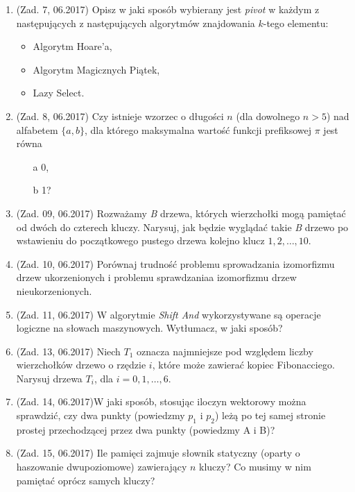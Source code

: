 \documentclass[10pt]{article}%
\begin{document}
\begin{enumerate}
\item (Zad. 7, 06.2017) Opisz w jaki sposób wybierany jest \emph{pivot} w każdym z następujących z następujących algorytmów znajdowania $k$-tego elementu: 
\begin{itemize}
\item Algorytm Hoare'a,
\item Algorytm Magicznych Piątek,
\item Lazy Select.
\end{itemize}

\item (Zad. 8, 06.2017) Czy istnieje wzorzec o długości $n$ (dla dowolnego $n>5$) nad alfabetem $\{a,b\}$, dla którego maksymalna wartość funkcji prefiksowej $\pi$ jest równa 
\begin{itemize}
\item[a] 0,
\item[b] 1?
\end{itemize}
 
\item (Zad. 09, 06.2017) Rozważamy \emph{B} drzewa, których wierzchołki mogą pamiętać od dwóch do czterech kluczy. Narysuj, jak będzie wyglądać takie \emph{B} drzewo po wstawieniu do początkowego pustego drzewa kolejno klucz $1,2,\ldots,10$.

\item (Zad. 10, 06.2017) Porównaj trudność problemu sprowadzania izomorfizmu drzew ukorzenionych i problemu sprawdzaniaa izomorfizmu drzew nieukorzenionych.

\item (Zad. 11, 06.2017) W algorytmie \emph{Shift And} wykorzystywane są operacje logiczne na słowach maszynowych. Wytłumacz, w jaki sposób?

\item (Zad. 13, 06.2017) Niech $T_{1}$ oznacza najmniejsze pod względem liczby wierzchołków drzewo o rzędzie $i$, które może zawierać kopiec Fibonacciego. Narysuj drzewa $T_{i}$, dla $i = 0,1,\ldots,6$.

\item (Zad. 14, 06.2017)W jaki sposób, stosując iloczyn wektorowy można sprawdzić, czy dwa punkty (powiedzmy $p_1$ i $p_2$) leżą po tej samej stronie prostej przechodzącej przez dwa punkty (powiedzmy A i B)?

\item (Zad. 15, 06.2017) Ile pamięci zajmuje słownik statyczny (oparty o haszowanie dwupoziomowe) zawierający $n$ kluczy? Co musimy w nim pamiętać oprócz samych kluczy?


\end{enumerate}
\end{document}
